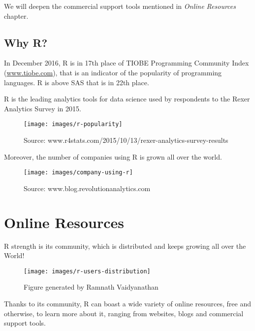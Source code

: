 \documentclass[]{book}
\begin{document}
We will deepen the commercial support tools mentioned in \emph{Online
Resources} chapter.

\section{Why R?}\label{why-r}

In December 2016, R is in 17th place of TIOBE Programming Community
Index (\href{http://www.tiobe.com/tiobe-index/}{www.tiobe.com}), that is
an indicator of the popularity of programming languages. R is above SAS
that is in 22th place.

R is the leading analytics tools for data science used by respondents to
the Rexer Analytics Survey in 2015.

\begin{figure}[h]

{\centering \texttt{[image: images/r-popularity]} 

}

\caption{Source: www.r4stats.com/2015/10/13/rexer-analytics-survey-results}\label{fig:g5}
\end{figure}

Moreover, the number of companies using R is grown all over the world.

\begin{figure}[h]

{\centering \texttt{[image: images/company-using-r]} 

}

\caption{Source: www.blog.revolutionanalytics.com}\label{fig:g6}
\end{figure}

\chapter{Online Resources}\label{online-resources}

R strength is its community, which is distributed and keeps growing all
over the World!

\begin{figure}[h]

{\centering \texttt{[image: images/r-users-distribution]} 

}

\caption{Figure generated by Ramnath Vaidyanathan}\label{fig:g1}
\end{figure}

Thanks to its community, R can boast a wide variety of online resources,
free and otherwise, to learn more about it, ranging from websites, blogs
and commercial support tools.
\end{document}
